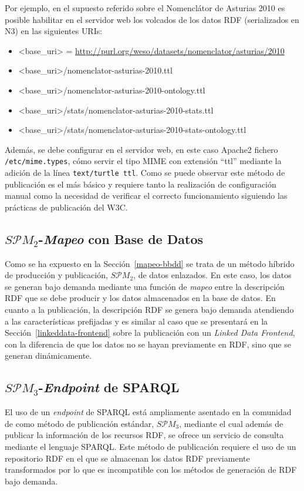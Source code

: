 Por ejemplo, en el supuesto referido sobre el Nomenclátor de Asturias 2010 es posible habilitar en el servidor
web los volcados de los datos \gls{RDF} (serializados en \gls{N3}) en las siguientes \gls{URI}s:

\begin{itemize}
 \item <base\_uri> = \url{http://purl.org/weso/datasets/nomenclator/asturias/2010}
 \item <base\_uri>/nomenclator-asturias-2010.ttl
 \item <base\_uri>/nomenclator-asturias-2010-ontology.ttl
 \item <base\_uri>/stats/nomenclator-asturias-2010-stats.ttl
 \item <base\_uri>/stats/nomenclator-asturias-2010-stats-ontology.ttl
\end{itemize}

Además, se debe configurar en el servidor web, en este caso Apache2 fichero \texttt{/etc/mime.types}, 
cómo servir el tipo MIME con extensión ``ttl'' mediante la adición de la línea \texttt{text/turtle	ttl}. Como se puede
observar este método de publicación es el más básico y requiere tanto la realización de configuración manual como 
la necesidad de verificar el correcto funcionamiento siguiendo las prácticas de publicación del W3C.

\subsection{$S\mathcal{P}M_{2}$-\textit{Mapeo} con Base de Datos}
Como se ha expuesto en la Sección~\ref{mapeo-bbdd} se trata de un método híbrido de producción
y publicación, $S\mathcal{P}M_{2}$, de datos enlazados. En este caso, los datos se generan bajo demanda mediante
una función de \textit{mapeo} entre la descripción \gls{RDF} que se debe producir y los datos
almacenados en la base de datos. En cuanto a la publicación, la descripción RDF se genera
bajo demanda atendiendo a las características prefijadas y es similar al caso que se presentará en la Sección~\ref{linkeddata-frontend} 
sobre la publicación con un \textit{Linked Data Frontend}, con la diferencia de que los datos no se hayan previamente en RDF, sino 
que se generan dinámicamente.

\subsection{$S\mathcal{P}M_{3}$-\textit{Endpoint} de SPARQL}\label{spm-3-pub}
El uso de un \textit{endpoint} de \gls{SPARQL} está ampliamente asentado en la comunidad
de \linkeddata como método de publicación estándar, $S\mathcal{P}M_{3}$, mediante
el cual además de publicar la información de los recursos RDF, se ofrece un servicio
de consulta mediante el lenguaje SPARQL. Este método de publicación requiere
el uso de un repositorio \gls{RDF} en el que se almacenan los datos RDF previamente
transformados por lo que es incompatible con los métodos de generación de RDF bajo demanda.

